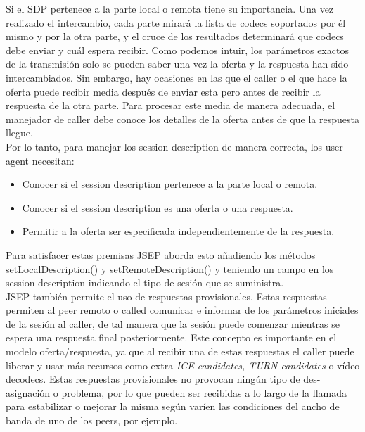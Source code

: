 Si el SDP pertenece a la parte local o remota tiene su importancia. Una vez realizado el intercambio, cada parte mirará la lista de codecs soportados por él mismo y por la otra parte, y el cruce de los resultados determinará que codecs debe enviar y cuál espera recibir. Como podemos intuir, los parámetros exactos de la transmisión solo se pueden saber una vez la oferta y la respuesta han sido intercambiados. Sin embargo, hay ocasiones en las que el caller o el que hace la oferta puede recibir media después de enviar esta pero antes de recibir la respuesta de la otra parte. Para procesar este media de manera adecuada, el manejador de caller debe conoce los detalles de la oferta antes de que la respuesta llegue.\\

Por lo tanto, para manejar los session description de manera correcta, los user agent necesitan:

\begin{itemize}
\item Conocer si el session description pertenece a la parte local o remota.
\item Conocer si el session description es una oferta o una respuesta.
\item Permitir a la oferta ser especificada independientemente de la respuesta.
\end{itemize}

Para satisfacer estas premisas JSEP aborda esto añadiendo los métodos setLocalDescription() y setRemoteDescription() y teniendo un campo en los session description indicando el tipo de sesión que se suministra.\\

JSEP también permite el uso de respuestas provisionales. Estas respuestas permiten al peer remoto o called comunicar e informar de los parámetros iniciales de la sesión al caller, de tal manera que la sesión puede comenzar mientras se espera una respuesta final posteriormente. Este concepto es importante en el modelo oferta/respuesta, ya que al recibir una de estas respuestas el caller puede liberar y usar más recursos como extra \textit{ICE candidates, TURN candidates} o vídeo decodecs. Estas respuestas provisionales no provocan ningún tipo de des-asignación o problema, por lo que pueden ser recibidas a lo largo de la llamada para estabilizar o mejorar la misma según varíen las condiciones del ancho de banda de uno de los peers, por ejemplo.\\




